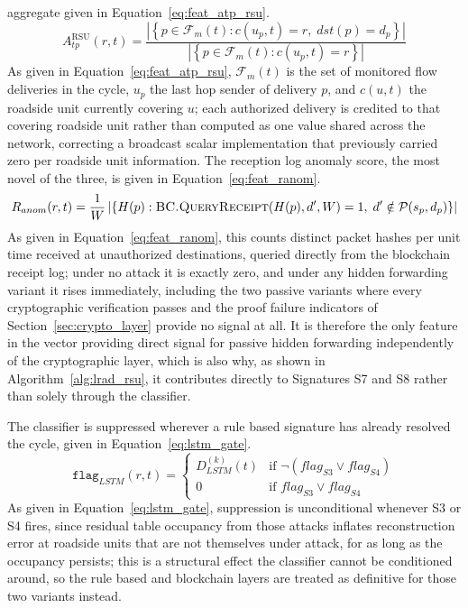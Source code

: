 \documentclass[final,5p,twocolumn]{elsarticle}
\theoremstyle{remark}
\theoremstyle{plain}
\begin{document}
aggregate given in Equation~\eqref{eq:feat_atp_rsu}.
\begin{equation}
	A_{tp}^{\mathrm{RSU}}(r,t) = \frac{\left|\left\{p \in \mathcal{F}_m(t) : c(u_p,t)=r,\; dst(p)=d_p\right\}\right|}{\left|\left\{p \in \mathcal{F}_m(t) : c(u_p,t)=r\right\}\right|}
	\label{eq:feat_atp_rsu}
\end{equation}
As given in Equation~\eqref{eq:feat_atp_rsu}, $\mathcal{F}_m(t)$ is the set
of monitored flow deliveries in the cycle, $u_p$ the last hop sender of
delivery $p$, and $c(u,t)$ the roadside unit currently covering $u$; each
authorized delivery is credited to that covering roadside unit rather than
computed as one value shared across the network, correcting a broadcast
scalar implementation that previously carried zero per roadside unit
information. The reception log anomaly score, the most novel of the three,
is given in Equation~\eqref{eq:feat_ranom}.
\begin{equation}
	R_{anom}(r,t) = \frac{1}{W}\left|\left\{ H(p) : \textsc{BC.QueryReceipt}(H(p),d',W) = 1,\; d' \notin \mathcal{P}(s_p, d_p) \right\}\right|
	\label{eq:feat_ranom}
\end{equation}
As given in Equation~\eqref{eq:feat_ranom}, this counts distinct packet
hashes per unit time received at unauthorized destinations, queried directly
from the blockchain receipt log; under no attack it is exactly zero, and
under any hidden forwarding variant it rises immediately, including the two
passive variants where every cryptographic verification passes and the
proof failure indicators of Section~\ref{sec:crypto_layer} provide no
signal at all. It is therefore the only feature in the vector providing
direct signal for passive hidden forwarding independently of the
cryptographic layer, which is also why, as shown in
Algorithm~\ref{alg:lrad_rsu}, it contributes directly to Signatures S7 and
S8 rather than solely through the classifier.

The classifier is suppressed wherever a rule based signature has already
resolved the cycle, given in Equation~\eqref{eq:lstm_gate}.
\begin{equation}
	\texttt{flag}_{LSTM}(r,t) =
	\begin{cases}
		D_{LSTM}^{(k)}(t) & \text{if } \neg(flag_{S3} \lor flag_{S4}) \\
		0 & \text{if } flag_{S3} \lor flag_{S4}
	\end{cases}
	\label{eq:lstm_gate}
\end{equation}
As given in Equation~\eqref{eq:lstm_gate}, suppression is unconditional
whenever S3 or S4 fires, since residual table occupancy from those attacks
inflates reconstruction error at roadside units that are not themselves
under attack, for as long as the occupancy persists; this is a structural
effect the classifier cannot be conditioned around, so the rule based and
blockchain layers are treated as definitive for those two variants instead.
\end{document}
